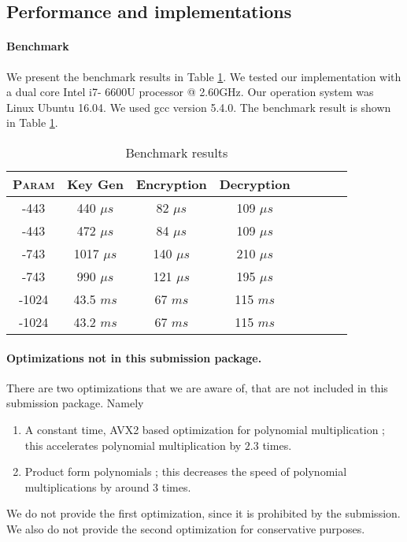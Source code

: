 \documentclass{llncs}
\newcommand{\ntrukem}{{\sf{ntru-kem}}}
\newcommand{\ntrupke}{{\sf{ntru-pke}}}
\newcommand{\ssntrupke}{{\sf{ss-ntru-pke}}}
\newcommand{\<}{\langle}
\renewcommand{\>}{\rangle}
\begin{document}
\subsection{Performance and implementations}
\paragraph{Benchmark}
We present the benchmark results in Table \ref{tab:bench}.
We tested our implementation with a dual core Intel i7-
6600U processor @ 2.60GHz. Our operation system was
Linux Ubuntu 16.04. We used gcc version 5.4.0.
The benchmark result is shown in Table \ref{tab:bench}.
\begin{table}
\centering
\caption{Benchmark results}
\label{tab:bench}
\begin{tabular}{|c|c|c|c|c|c|c|c|}\hline
\textsc{Param} &Key Gen & Encryption & Decryption\\\hline\hline
\ntrukem-443 & 440 $\mu s$ & 82 $\mu s$ &109 $\mu s$  \\%
\ntrupke-443 & 472 $\mu s$ & 84 $\mu s$ &109 $\mu s$  \\
\hline
\ntrukem-743 & 1017 $\mu s$& 140 $\mu s$&210 $\mu s$\\%
\ntrupke-743 & 990 $\mu s$& 121 $\mu s$& 195 $\mu s$\\\hline
\ntrukem-1024 &43.5 $ms$ & 67 $ms$ &115 $ms$\\
\ntrupke-1024 &43.2 $ms$ & 67 $ms$ &115 $ms$\\\hline
\end{tabular}
\end{table}


\paragraph{Optimizations not in this submission package.}
There are two optimizations that we are aware of, that are not 
included in this submission package. Namely
\begin{enumerate}
\item A constant time, AVX2 based optimization for polynomial multiplication \cite{ntrutoc}; this accelerates polynomial multiplication by $2.3$ times.
\item Product form polynomials \cite{DBLP:conf/ctrsa/HoffsteinPSSWZ17}; this decreases the speed of
polynomial multiplications by around 3 times.
\end{enumerate}
We do not provide the first optimization, since it is prohibited
by the submission. We also do not provide the second optimization
for conservative purposes. 
\end{document}
